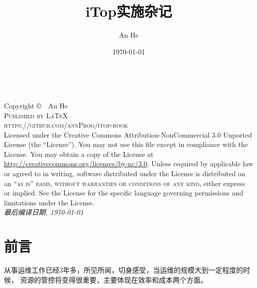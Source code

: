 \documentclass[fancyhdr,bookmark]{ctexbook}
\title{iTop实施杂记}
\author{An He}
\date{\today}
\begin{document}
\frontmatter

\begingroup
\thispagestyle{empty}
\vfill
\endgroup
{}

\newpage
~\vfill
\thispagestyle{empty}

\noindent Copyright \copyright\ \the\year\  An He\\ %

\noindent \textsc{Published by \LaTeX}\\ %
\noindent \textsc{https://github.com/annProg/itop-book}\\ %

\noindent Licensed under the Creative Commons Attribution-NonCommercial 3.0 Unported License (the ``License''). You may not use this file except in compliance with the License. You may obtain a copy of the License at \url{http://creativecommons.org/licenses/by-nc/3.0}. Unless required by applicable law or agreed to in writing, software distributed under the License is distributed on an \textsc{``as is'' basis, without warranties or conditions of any kind}, either express or implied. See the License for the specific language governing permissions and limitations under the License.\\ %

\noindent \textit{最后编译日期, \today\ \currenttime } %


    
\chapter*{前言}
从事运维工作已经3年多，所见所闻，切身感受，当运维的规模大到一定程度的时候，
资源的管控将变得很重要，主要体现在效率和成本两个方面。
\end{document}
